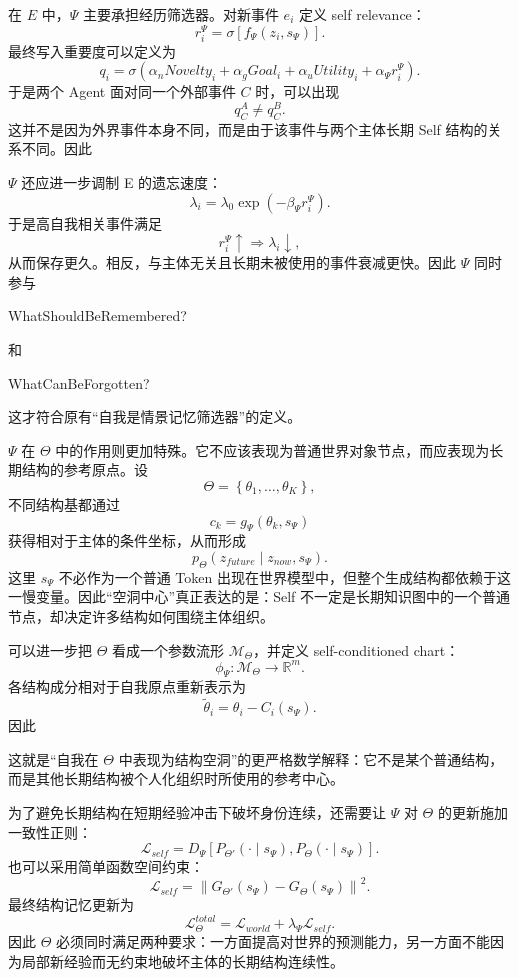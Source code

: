 在 $E$ 中，$\Psi$ 主要承担经历筛选器。对新事件 $e_i$ 定义 self relevance：
\[
r_i^\Psi
=
\sigma
\left[
f_\Psi
\left(
z_i,s_\Psi
\right)
\right].
\]
最终写入重要度可以定义为
\[
q_i
=
\sigma
\left(
\alpha_nNovelty_i
+
\alpha_gGoal_i
+
\alpha_uUtility_i
+
\alpha_\Psi r_i^\Psi
\right).
\]
于是两个 Agent 面对同一个外部事件 $C$ 时，可以出现
\[
q_C^{A}
\neq
q_C^{B}.
\]
这并不是因为外界事件本身不同，而是由于该事件与两个主体长期 Self 结构的关系不同。因此
\begin{statementbox}
\centering
{}
\end{statementbox}

$\Psi$ 还应进一步调制 E 的遗忘速度：
\[
\lambda_i
=
\lambda_0
\exp
\left(
-\beta_\Psi r_i^\Psi
\right).
\]
于是高自我相关事件满足
\[
r_i^\Psi\uparrow
\Rightarrow
\lambda_i\downarrow,
\]
从而保存更久。相反，与主体无关且长期未被使用的事件衰减更快。因此 $\Psi$ 同时参与
\begin{statementbox}
WhatShouldBeRemembered?
\end{statementbox}
和
\begin{statementbox}
WhatCanBeForgotten?
\end{statementbox}
这才符合原有“自我是情景记忆筛选器”的定义。

$\Psi$ 在 $\Theta$ 中的作用则更加特殊。它不应该表现为普通世界对象节点，而应表现为长期结构的参考原点。设
\[
\Theta
=
\left\{
\theta_1,\ldots,\theta_K
\right\},
\]
不同结构基都通过
\[
c_k
=
g_\Psi
\left(
\theta_k,s_\Psi
\right)
\]
获得相对于主体的条件坐标，从而形成
\[
p_\Theta
\left(
z_{future}
\mid
z_{now},s_\Psi
\right).
\]
这里 $s_\Psi$ 不必作为一个普通 Token 出现在世界模型中，但整个生成结构都依赖于这一慢变量。因此“空洞中心”真正表达的是：Self 不一定是长期知识图中的一个普通节点，却决定许多结构如何围绕主体组织。

可以进一步把 $\Theta$ 看成一个参数流形 $\mathcal{M}_\Theta$，并定义 self-conditioned chart：
\[
\phi_\Psi:
\mathcal{M}_\Theta
\rightarrow
\mathbb{R}^{m}.
\]
各结构成分相对于自我原点重新表示为
\[
\widetilde{\theta}_i
=
\theta_i
-
C_i
\left(
s_\Psi
\right).
\]
因此
\begin{statementbox}
\centering
{}
\end{statementbox}
这就是“自我在 $\Theta$ 中表现为结构空洞”的更严格数学解释：它不是某个普通结构，而是其他长期结构被个人化组织时所使用的参考中心。

为了避免长期结构在短期经验冲击下破坏身份连续，还需要让 $\Psi$ 对 $\Theta$ 的更新施加一致性正则：
\[
\mathcal{L}_{self}
=
D_\Psi
\left[
P_{\Theta'}(\cdot\mid s_\Psi),
P_{\Theta}(\cdot\mid s_\Psi)
\right].
\]
也可以采用简单函数空间约束：
\[
\mathcal{L}_{self}
=
\left\|
G_{\Theta'}(s_\Psi)
-
G_{\Theta}(s_\Psi)
\right\|^2.
\]
最终结构记忆更新为
\[
\mathcal{L}_{\Theta}^{total}
=
\mathcal{L}_{world}
+
\lambda_\Psi\mathcal{L}_{self}.
\]
因此 $\Theta$ 必须同时满足两种要求：一方面提高对世界的预测能力，另一方面不能因为局部新经验而无约束地破坏主体的长期结构连续性。

